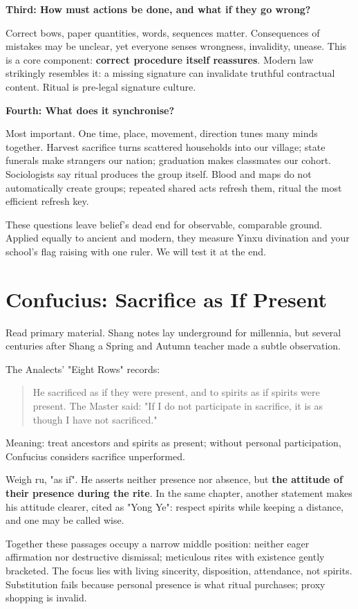 \textbf{Third: How must actions be done, and what if they go wrong?}

Correct bows, paper quantities, words, sequences matter. Consequences of mistakes may be unclear, yet everyone senses wrongness, invalidity, unease. This is a core component: \textbf{correct procedure itself reassures}. Modern law strikingly resembles it: a missing signature can invalidate truthful contractual content. Ritual is pre-legal signature culture.

\textbf{Fourth: What does it synchronise?}

Most important. One time, place, movement, direction tunes many minds together. Harvest sacrifice turns scattered households into our village; state funerals make strangers our nation; graduation makes classmates our cohort. Sociologists say ritual produces the group itself. Blood and maps do not automatically create groups; repeated shared acts refresh them, ritual the most efficient refresh key.

These questions leave belief's dead end for observable, comparable ground. Applied equally to ancient and modern, they measure Yinxu divination and your school's flag raising with one ruler. We will test it at the end.

\section{Confucius: Sacrifice as If Present}
Read primary material. Shang notes lay underground for millennia, but several centuries after Shang a Spring and Autumn teacher made a subtle observation.

The Analects' "Eight Rows" records:

\begin{quote}
He sacrificed as if they were present, and to spirits as if spirits were present. The Master said: "If I do not participate in sacrifice, it is as though I have not sacrificed."
\end{quote}
Meaning: treat ancestors and spirits as present; without personal participation, Confucius considers sacrifice unperformed.

Weigh ru, "as if". He asserts neither presence nor absence, but \textbf{the attitude of their presence during the rite}. In the same chapter, another statement makes his attitude clearer, cited as "Yong Ye": respect spirits while keeping a distance, and one may be called wise.

Together these passages occupy a narrow middle position: neither eager affirmation nor destructive dismissal; meticulous rites with existence gently bracketed. The focus lies with living sincerity, disposition, attendance, not spirits. Substitution fails because personal presence is what ritual purchases; proxy shopping is invalid.

